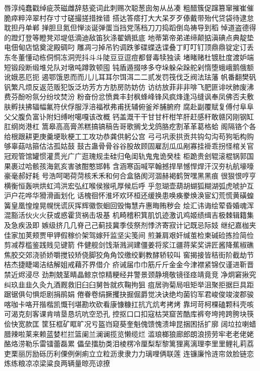 唇淳纯蠢戳绰疵茨磁雌辞慈瓷词此刺赐次聪葱囱匆从丛凑
粗醋簇促蹿篡窜摧崔催脆瘁粹淬翠村存⼨寸磋撮搓措挫错
搭达答瘩打⼤大呆⽍歹傣戴带殆代贷袋待逮怠耽担丹单郸
掸胆旦氮但惮淡诞弹蛋当挡党荡档⼑刀捣蹈倒岛祷导到稻
悼道盗德得的蹬灯登等瞪凳邓堤低滴迪敌笛狄涤翟嫡抵底
地蒂第帝弟递缔颠掂滇碘点典靛垫电佃甸店惦奠淀殿碉叼
雕凋刁掉吊钓调跌爹碟蝶迭谍叠丁盯叮钉顶⿍鼎锭定订丢
东冬董懂动栋侗恫冻洞兜抖⽃斗陡⾖豆逗痘都督毒犊独读
堵睹赌杜镀肚度渡妒端短锻段断缎堆兑队对墩吨蹲敦顿囤
钝盾遁掇哆多夺垛躲朵跺舵剁惰堕蛾峨鹅俄额讹娥恶厄扼
遏鄂饿恩⽽而⼉儿⽿耳尔饵洱⼆二贰发罚筏伐乏阀法珐藩
帆番翻樊矾钒繁凡烦反返范贩犯饭泛坊芳⽅方肪房防妨仿
访纺放菲⾮非啡飞肥匪诽吠肺废沸费芬酚吩氛分纷坟焚汾
粉奋份忿愤粪丰封枫蜂峰锋风疯烽逢冯缝讽奉凤佛否夫敷
肤孵扶拂辐幅氟符伏俘服浮涪福袱弗甫抚辅俯釜斧脯腑府
腐赴副覆赋复傅付⾩阜⽗父腹负富讣附妇缚咐噶嘎该改概
钙盖溉⼲干⽢甘杆柑竿肝赶感秆敢赣冈刚钢缸肛纲岗港杠
篙皋⾼高膏羔糕搞镐稿告哥歌搁⼽戈鸽胳疙割⾰革葛格蛤
阁隔铬个各给根跟耕更庚羹埂耿梗⼯工攻功恭龚供躬公宫
⼸弓巩汞拱贡共钩勾沟苟狗垢构购够辜菇咕箍估沽孤姑⿎
鼓古蛊⾻骨⾕谷股故顾固雇刮⽠瓜剐寡挂褂乖拐怪棺关官
冠观管馆罐惯灌贯光⼴广逛瑰规圭硅归龟闺轨⿁鬼诡癸桂
柜跪贵刽辊滚棍锅郭国果裹过哈骸孩海氦亥害骇酣憨邯韩
含涵寒函喊罕翰撼捍旱憾悍焊汗汉夯杭航壕嚎豪毫郝好耗
号浩呵喝荷菏核⽲禾和何合盒貉阂河涸赫褐鹤贺嘿⿊黑痕
很狠恨哼亨横衡恒轰哄烘虹鸿洪宏弘红喉侯猴吼厚候后呼
乎忽瑚壶葫胡蝴狐糊湖弧虎唬护互沪户花哗华猾滑画划化
话槐徊怀淮坏欢环桓还缓换患唤痪豢焕涣宦幻荒慌黄磺蝗
簧皇凰惶煌晃幌恍谎灰挥辉徽恢蛔回毁悔慧卉惠晦贿秽会
烩汇讳诲绘荤昏婚魂浑混豁活伙⽕火获或惑霍货祸击圾基
机畸稽积箕肌饥迹激讥鸡姬绩缉吉极棘辑籍集及急疾汲即
嫉级挤⼏几脊⼰己蓟技冀季伎祭剂悸济寄寂计记既忌际妓
继纪嘉枷夹佳家加荚颊贾甲钾假稼价架驾嫁歼监坚尖笺间
煎兼肩艰奸缄茧检柬碱硷拣捡简俭剪减荐槛鉴践贱见键箭
件健舰剑饯渐溅涧建僵姜将浆江疆蒋桨奖讲匠酱降蕉椒礁
焦胶交郊浇骄娇嚼搅铰矫侥脚狡⾓角饺缴绞剿教酵轿较叫
窖揭接皆秸街阶截劫节桔杰捷睫竭洁结解姐戒藉芥界借介
疥诫届⼱巾筋⽄斤⾦金今津襟紧锦仅谨进靳晋禁近烬浸尽
劲荆兢茎睛晶鲸京惊精粳经井警景颈静境敬镜径痉靖竟竞
净炯窘揪究纠玖⾲韭久灸九酒厩救旧⾅臼舅咎就疚鞠拘狙
疽居驹菊局咀矩举沮聚拒据巨具距踞锯俱句惧炬剧捐鹃娟
倦眷卷绢撅攫抉掘倔爵觉决诀绝均菌钧军君峻俊竣浚郡骏
喀咖卡咯开揩楷凯慨刊堪勘坎砍看康慷糠扛抗亢炕考拷烤
靠坷苛柯棵磕颗科壳咳可渴克刻客课肯啃垦恳坑吭空恐孔
控抠⼝口扣寇枯哭窟苦酷库裤夸垮挎跨胯块筷侩快宽款匡
筐狂框矿眶旷况亏盔岿窥葵奎魁傀馈愧溃坤昆捆困括扩廓
阔垃拉喇蜡腊辣啦莱来赖蓝婪栏拦篮阑兰澜谰揽览懒缆烂
滥琅榔狼廊郎朗浪捞劳牢⽼老佬姥酪烙涝勒乐雷镭蕾磊累
儡垒擂肋类泪棱楞冷厘梨犁黎篱狸离漓理李⾥里鲤礼莉荔
吏栗丽厉励砾历利傈例俐痢⽴立粒沥⾪隶⼒力璃哩俩联莲
连镰廉怜涟帘敛脸链恋炼练粮凉凉梁粱良两辆量晾亮谅撩
